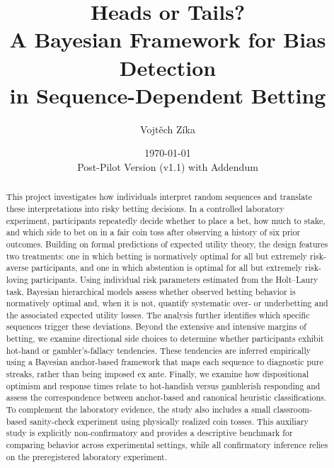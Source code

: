\documentclass[11pt,a4paper]{article}
\title{Heads or Tails? \\ A Bayesian Framework for Bias Detection \\ in Sequence-Dependent Betting}
\author{%
	Vojtěch Zíka
}
\date{\today\\
	Post-Pilot Version (v1.1) with Addendum}
\numberwithin{equation}{section}
\begin{document}
\maketitle


\begin{abstract}
This project investigates how individuals interpret random sequences and translate these interpretations into risky betting decisions. In a controlled laboratory experiment, participants repeatedly decide whether to place a bet, how much to stake, and which side to bet on in a fair coin toss after observing a history of six prior outcomes. Building on formal predictions of expected utility theory, the design features two treatments: one in which betting is normatively optimal for all but extremely risk-averse participants, and one in which abstention is optimal for all but extremely risk-loving participants.
Using individual risk parameters estimated from the Holt–Laury task, Bayesian hierarchical models assess whether observed betting behavior is normatively optimal and, when it is not, quantify systematic over- or underbetting and the associated expected utility losses. The analysis further identifies which specific sequences trigger these deviations. 
Beyond the extensive and intensive margins of betting, we examine directional side choices to determine whether participants exhibit hot-hand or gambler’s-fallacy tendencies. These tendencies are inferred empirically using a Bayesian anchor-based framework that maps each sequence to diagnostic pure streaks, rather than being imposed ex ante. Finally, we examine how dispositional optimism and response times relate to hot-handish versus gamblerish responding and assess the correspondence between anchor-based and canonical heuristic classifications.
To complement the laboratory evidence, the study also includes a small classroom-based sanity-check experiment using physically realized coin tosses. This auxiliary study is explicitly non-confirmatory and provides a descriptive benchmark for comparing behavior across experimental settings, while all confirmatory inference relies on the preregistered laboratory experiment.
\end{abstract}

	\clearpage
\tableofcontents  %
	
	
	\clearpage
\end{document}
